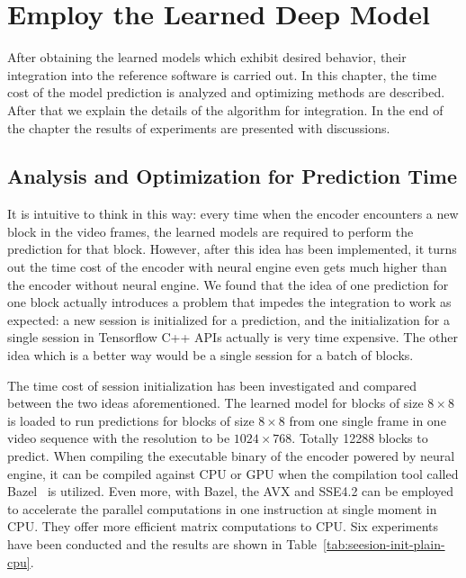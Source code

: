 \chapter{Employ the Learned Deep Model}\label{ch:chapter5} %
%
%
After obtaining the learned models which exhibit desired behavior, 
their integration into the reference software is carried out.
In this chapter, the time cost of the model prediction
is analyzed and optimizing methods are described.
After that we explain the details of the algorithm for integration.
In the end of the chapter the results of experiments 
are presented with discussions.

%
\section{Analysis and Optimization for Prediction Time}\label{sec:analysis-and-optimization}
It is intuitive to think in this way: 
every time when the encoder encounters a new block in the video frames,
the learned models are required to perform the prediction for that block.
However, after this idea has been implemented, it turns out the
time cost of the encoder with neural engine even gets much higher 
than the encoder without neural engine.
We found that the idea of one prediction for one block actually
introduces a problem that impedes the integration to work as expected:
a new session is initialized for a prediction, and the initialization
for a single session in Tensorflow C++ APIs actually is very time
expensive.
The other idea which is a better way would be a single 
session for a batch of blocks.

The time cost of session initialization has been investigated
and compared between the two ideas aforementioned.
The learned model for blocks of size \(8\times8\) is loaded 
to run predictions for blocks of size \(8\times8\) from one single
frame in one video sequence with the resolution to 
be \(1024\times768\).
Totally 12288 blocks to predict.
When compiling the executable binary of the encoder
powered by neural engine, it can be compiled 
against CPU or GPU when the compilation tool 
called Bazel~\parencite{RN200} is utilized.
Even more, with Bazel, the AVX and SSE4.2 can be employed to
accelerate the parallel computations in one instruction
at single moment in CPU\@.
They offer more efficient matrix computations
to CPU\@.
Six experiments have been conducted and the results
are shown in 
Table~\ref{tab:seesion-init-plain-cpu}.

